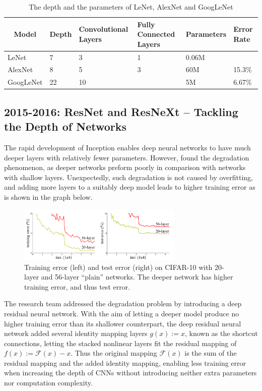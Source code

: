 \documentclass[a4paper]{article}
\begin{document}
\begin{enumerate}
\begin{table}[ht]
\caption{The depth and the parameters of LeNet, AlexNet and GoogLeNet}
\begin{tabular}{l|lllll}
\hline
\multicolumn{1}{c|}{Model} & Depth & Convolutional Layers & Fully Connected Layers & Parameters & Error Rate \\ \hline
LeNet     & 7  & 3  & 1 & 0.06M &        \\ \hline
AlexNet   & 8  & 5  & 3 & 60M   & 15.3\% \\ \hline
GoogLeNet & 22 & 10 &   & 5M    & 6.67\% \\ \hline
\end{tabular}

\end{table}

\end{enumerate}

\subsection{2015-2016: ResNet and ResNeXt – Tackling the Depth of Networks}
The rapid development of Inception enables deep neural networks to have much deeper layers with relatively fewer parameters. However, \citet{DBLP:journals/corr/HeZRS15} found the degradation phenomenon, as deeper networks preform poorly in comparison with networks with shallow layers. Unexpectedly, such degradation is not caused by overfitting, and adding more layers to a suitably deep model leads to higher training error as is shown in the graph below.

 
\begin{figure}[ht]
    \centering
    \includegraphics[width=0.7\textwidth,height=0.25\textwidth]{images/ResNet1.png}
    \caption{Training error (left) and test error (right) on CIFAR-10
with 20-layer and 56-layer “plain” networks. The deeper network
has higher training error, and thus test error. \citep{DBLP:journals/corr/HeZRS15}}

\end{figure}

The research team addressed the degradation problem by introducing a deep residual neural network. With the aim of letting a deeper model produce no higher training error than its shallower counterpart, the deep residual neural network added several identity mapping layers $g(x):=x$, known as the shortcut connections, letting the stacked nonlinear layers fit the residual mapping of $f(x):=\mathcal{F} (x)-x$. Thus the original mapping $\mathcal{F} (x)$ is the sum of the residual mapping and the added identity mapping, enabling less training error when increasing the depth of CNNs without introducing neither extra parameters nor computation complexity.
\end{document}
